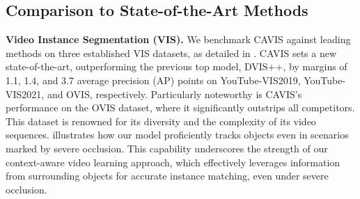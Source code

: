 \documentclass[10pt,twocolumn,letterpaper]{article}
\begin{document}








\subsection{Comparison to State-of-the-Art Methods}

\textbf{Video Instance Segmentation (VIS).}
We benchmark CAVIS against leading methods on three established VIS datasets, as detailed in . CAVIS sets a new state-of-the-art, outperforming the previous top model, DVIS++, by margins of 1.1, 1.4, and 3.7 average precision (AP) points on YouTube-VIS2019, YouTube-VIS2021, and OVIS, respectively. Particularly noteworthy is CAVIS's performance on the OVIS dataset, where it significantly outstrips all competitors. This dataset is renowned for its diversity and the complexity of its video sequences.  
 illustrates how our model proficiently tracks objects even in scenarios marked by severe occlusion.
This capability underscores the strength of our context-aware video learning approach, which effectively leverages information from surrounding objects for accurate instance matching, even under severe occlusion.
\end{document}

